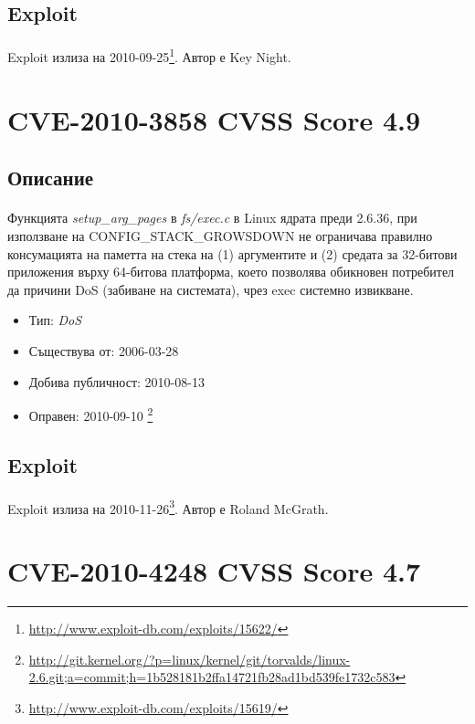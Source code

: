 \documentclass[a4paper,12pt,leqno]{article}
\begin{document}
\subsection{Exploit}
\paragraph{}
Exploit излиза на 2010-09-25\footnote{\url{http://www.exploit-db.com/exploits/15622/}}. Автор е Key Night.

\section{CVE-2010-3858 CVSS Score 4.9}
\subsection{Описание}
\paragraph{}
Функцията \textit{setup\_arg\_pages} в \textit{fs/exec.c} в Linux ядрата преди 2.6.36, при използване на CONFIG\_STACK\_GROWSDOWN не ограничава правилно консумацията на паметта на стека на (1) аргументите и (2) средата за 32-битови приложения върху 64-битова платформа, което позволява обикновен потребител да причини DoS (забиване на системата), чрез exec системно извикване.

\begin{itemize}
    \item Тип: \textit{DoS}
    \item Съществува от: 2006-03-28
  	\item Добива публичност: 2010-08-13
    \item Оправен: 2010-09-10 \footnote{\url{http://git.kernel.org/?p=linux/kernel/git/torvalds/linux-2.6.git;a=commit;h=1b528181b2ffa14721fb28ad1bd539fe1732c583}}
\end{itemize}

\subsection{Exploit}
\paragraph{}
Exploit излиза на 2010-11-26\footnote{\url{http://www.exploit-db.com/exploits/15619/}}. Автор е Roland McGrath.


\section{CVE-2010-4248 CVSS Score 4.7}
\end{document}
